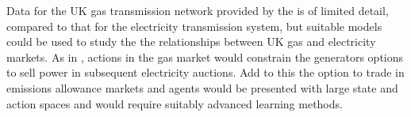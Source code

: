 Data for the UK gas transmission network provided by the  is
of limited detail, compared to that for the electricity transmission system,
but suitable models could be used to study the the relationships
between UK gas and electricity markets.  As in , actions in
the gas market would constrain the generators options to sell power in subsequent
electricity auctions.  Add to this the option to trade in emissions allowance
markets and agents would be presented with large state and action spaces and
would require suitably advanced learning methods.

%
%


